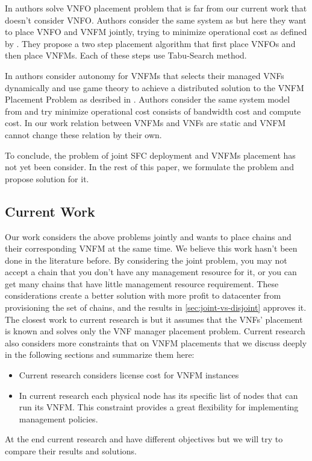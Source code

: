 In \cite{AbuLebdeh20172} authors solve VNFO placement problem that is far from our current work that doesn't consider VNFO.
Authors consider the same system as \cite{AbuLebdeh2017} but here they want to place VNFO and VNFM jointly, trying to minimize operational cost as defined by \cite{AbuLebdeh2017}.
They propose a two step placement algorithm that first place VNFOs and then place VNFMs. Each of these steps use Tabu-Search method.

In \cite{Chiang2019} authors consider autonomy for VNFMs that selects their managed VNFs dynamically and use game theory to achieve a distributed solution to the VNFM Placement Problem as desribed in \cite{AbuLebdeh2017}.
Authors consider the same system model from \cite{AbuLebdeh2017} and try minimize operational cost consists of bandwidth cost and compute cost.
In our work relation between VNFMs and VNFs are static and VNFM cannot change these relation by their own.

To conclude, the problem of joint SFC deployment and VNFMs placement has not yet been consider. In the rest of this paper, we formulate the problem and propose solution for it.

\subsection{Current Work}

Our work considers the above problems jointly and wants to place chains and their corresponding VNFM at the same time.
We believe this work hasn't been done in the literature before.
By considering the joint problem, you may not accept a chain that you don't have any management resource for it,
or you can get many chains that have little management resource requirement.
These considerations create a better solution with more profit to datacenter from provisioning the set of chains,
and the results in \ref{sec:joint-vs-disjoint} approves it.
The closest work to current research is \cite{AbuLebdeh2017} but it assumes that the VNFs' placement is known and solves only the VNF manager placement problem. Current research also considers more constraints that \cite{AbuLebdeh2017} on VNFM placements that we discuss deeply in the following sections and summarize them here:

\begin{itemize}
    \item Current research considers license cost for VNFM instances
    \item In current research each physical node has its specific list of nodes that can run its VNFM. This constraint provides a great flexibility for implementing management policies.
\end{itemize}

At the end current research and \cite{AbuLebdeh2017} have different objectives but we will try to compare their results and solutions.
